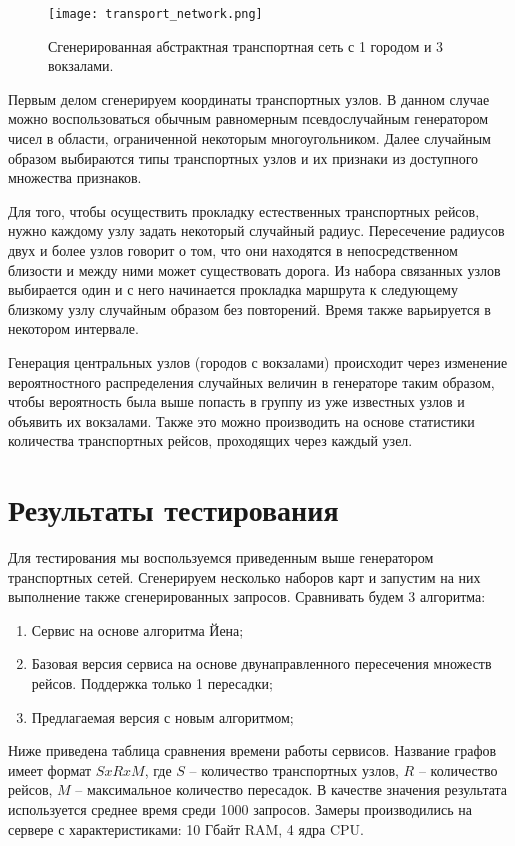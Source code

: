 \begin{figure}[!h]
	\centering
	\texttt{[image: transport\_network.png]}
	\caption{Сгенерированная абстрактная транспортная сеть с 1 городом и 3 вокзалами.}\label{fig12}
\end{figure}

Первым делом сгенерируем координаты транспортных узлов. В данном случае можно воспользоваться обычным равномерным псевдослучайным генератором чисел в области, ограниченной некоторым многоугольником. Далее случайным образом выбираются типы транспортных узлов и их признаки из доступного множества признаков.

Для того, чтобы осуществить прокладку естественных транспортных рейсов, нужно каждому узлу задать некоторый случайный радиус. Пересечение радиусов двух и более узлов говорит о том, что они находятся в непосредственном близости и между ними может существовать дорога. Из набора связанных узлов выбирается один и с него начинается прокладка маршрута к следующему близкому узлу случайным образом без повторений. Время также варьируется в некотором интервале.

Генерация центральных узлов (городов с вокзалами) происходит через изменение вероятностного распределения случайных величин в генераторе таким образом, чтобы вероятность была выше попасть в группу из уже известных узлов и объявить их вокзалами. Также это можно производить на основе статистики количества транспортных рейсов, проходящих через каждый узел.

\FloatBarrier
\section{Результаты тестирования}
Для тестирования мы воспользуемся приведенным выше генератором транспортных сетей. Сгенерируем несколько наборов карт и запустим на них выполнение также сгенерированных запросов. Сравнивать будем 3 алгоритма:
\begin{enumerate}
	\item Сервис на основе алгоритма Йена;
	\item Базовая версия сервиса на основе двунаправленного пересечения множеств рейсов. Поддержка только 1 пересадки;
	\item Предлагаемая версия с новым алгоритмом;
\end{enumerate}
Ниже приведена таблица сравнения времени работы сервисов. Название графов имеет формат $SxRxM$, где $S$ -- количество транспортных узлов, $R$ -- количество рейсов, $M$ -- максимальное количество пересадок. В качестве значения результата используется среднее время среди 1000 запросов. Замеры производились на сервере с характеристиками: 10 Гбайт RAM, 4 ядра CPU.


